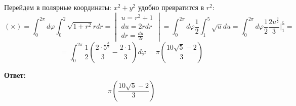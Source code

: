 \documentclass[a4paper,12pt]{article}
\begin{document}
Перейдем в полярные координаты: $x^2 + y^2$ удобно превратится в $r^2$:
\[
(\times) = \int_0^{2\pi} d \varphi \int_0^2 \sqrt{1+r^2} r dr = \begin{vmatrix}
u = r^2 + 1 \\
du = 2rdr \\
dr = \frac{du}{2r}
\end{vmatrix}
=
\int_0^{2\pi} d \varphi \frac{1}{2} \int_1^5 \sqrt{u}du  = \int_0^{2\pi} d \varphi \frac{1}{2}\frac{2u^\frac{3}{2}}{3} \Bigg|^5_1 =
\]
\[
= \int_0^{2\pi}  \frac{1}{2}\left( \frac{2 \cdot 5^\frac{3}{2}}{3} - \frac{2 \cdot 1}{3}  \right) d\varphi= \pi \left(\frac{10\sqrt{5} - 2}{3}\right)
\]
\begin{center}
\textbf{Ответ: } 
\[
 \pi \left(\frac{10\sqrt{5} - 2}{3}\right)
\]
\end{center}
\end{document}
